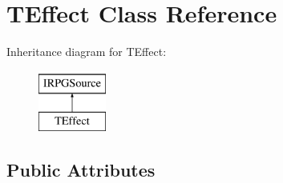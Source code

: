 \hypertarget{class_t_effect}{}\section{T\+Effect Class Reference}
\label{class_t_effect}
Inheritance diagram for T\+Effect\+:\begin{figure}[H]
\begin{center}
\leavevmode
\includegraphics[height=2.000000cm]{class_t_effect}
\end{center}
\end{figure}
\subsection*{Public Attributes}
